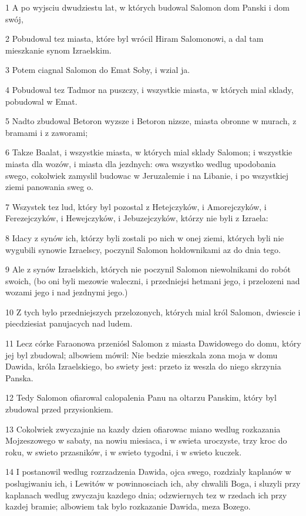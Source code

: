 \par 1 A po wyjsciu dwudziestu lat, w których budowal Salomon dom Panski i dom swój,
\par 2 Pobudowal tez miasta, które byl wrócil Hiram Salomonowi, a dal tam mieszkanie synom Izraelskim.
\par 3 Potem ciagnal Salomon do Emat Soby, i wzial ja.
\par 4 Pobudowal tez Tadmor na puszczy, i wszystkie miasta, w których mial sklady, pobudowal w Emat.
\par 5 Nadto zbudowal Betoron wyzsze i Betoron nizsze, miasta obronne w murach, z bramami i z zaworami;
\par 6 Takze Baalat, i wszystkie miasta, w których mial sklady Salomon; i wszystkie miasta dla wozów, i miasta dla jezdnych: owa wszystko wedlug upodobania swego, cokolwiek zamyslil budowac w Jeruzalemie i na Libanie, i po wszystkiej ziemi panowania sweg o.
\par 7 Wszystek tez lud, który byl pozostal z Hetejczyków, i Amorejczyków, i Ferezejczyków, i Hewejczyków, i Jebuzejczyków, którzy nie byli z Izraela:
\par 8 Idacy z synów ich, którzy byli zostali po nich w onej ziemi, których byli nie wygubili synowie Izraelscy, poczynil Salomon holdownikami az do dnia tego.
\par 9 Ale z synów Izraelskich, których nie poczynil Salomon niewolnikami do robót swoich, (bo oni byli mezowie waleczni, i przedniejsi hetmani jego, i przelozeni nad wozami jego i nad jezdnymi jego.)
\par 10 Z tych bylo przedniejszych przelozonych, których mial król Salomon, dwiescie i piecdziesiat panujacych nad ludem.
\par 11 Lecz córke Faraonowa przeniósl Salomon z miasta Dawidowego do domu, który jej byl zbudowal; albowiem mówil: Nie bedzie mieszkala zona moja w domu Dawida, króla Izraelskiego, bo swiety jest: przeto iz weszla do niego skrzynia Panska.
\par 12 Tedy Salomon ofiarowal calopalenia Panu na oltarzu Panskim, który byl zbudowal przed przysionkiem.
\par 13 Cokolwiek zwyczajnie na kazdy dzien ofiarowac miano wedlug rozkazania Mojzeszowego w sabaty, na nowiu miesiaca, i w swieta uroczyste, trzy kroc do roku, w swieto przasników, i w swieto tygodni, i w swieto kuczek.
\par 14 I postanowil wedlug rozrzadzenia Dawida, ojca swego, rozdzialy kaplanów w poslugiwaniu ich, i Lewitów w powinnosciach ich, aby chwalili Boga, i sluzyli przy kaplanach wedlug zwyczaju kazdego dnia; odzwiernych tez w rzedach ich przy kazdej bramie; albowiem tak bylo rozkazanie Dawida, meza Bozego.
